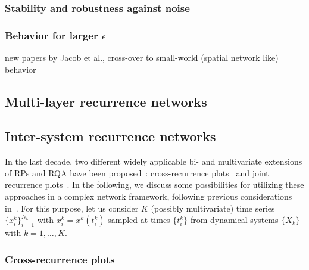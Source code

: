         \subsubsection{Stability and robustness against noise}
        
        \subsubsection{Behavior for larger $\epsilon$}
        new papers by Jacob et al., cross-over to small-world (spatial network like) behavior

	\subsection{Multi-layer recurrence networks}

	\subsection{Inter-system recurrence networks}
    
In the last decade, two different widely applicable bi- and multivariate extensions of RPs and RQA have been proposed~\cite{marwan2007}: cross-recurrence plots~\cite{Marwan2002PLA,Zbilut1998} and joint recurrence plots~\cite{Romano2004PLA}. In the following, we discuss some possibilities for utilizing these approaches in a complex network framework, following previous considerations in~\cite{Feldhoff2011,Feldhoff2012,Feldhoff2013}. For this purpose, let us consider $K$ (possibly multivariate) time series $\{x_i^k\}_{i=1}^{N_k}$ with $x_i^k=x^k(t^k_i)$ sampled at times $\{t^k_i\}$ from dynamical systems $\{X_k\}$ with $k=1,\dots,K$. 


    
		\subsubsection{Cross-recurrence plots}
        
